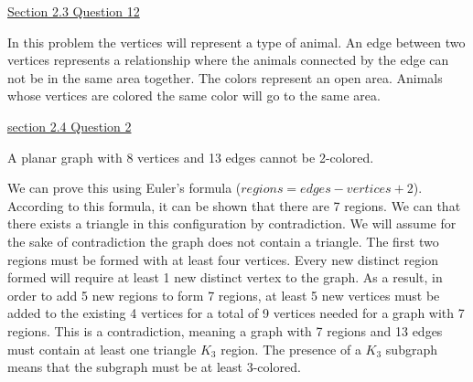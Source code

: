 \documentclass{article}
\begin{document}
\underline{Section 2.3 Question 12}

In this problem the vertices will represent a type of animal. An edge between two vertices represents a relationship where the animals connected by the edge can not be in the same area together. The colors represent an open area. Animals whose vertices are colored the same color will go to the same area.

\underline{section 2.4 Question 2}

A planar graph with 8 vertices and 13 edges cannot be 2-colored.

We can prove this using Euler's formula ($regions=edges-vertices+2$). According to this formula, it can be shown that there are 7 regions. We can that there exists a triangle in this configuration by contradiction. We will assume for the sake of contradiction the graph does not contain a triangle. The first two regions must be formed with at least four vertices. Every new distinct region formed will require at least 1 new distinct vertex to the graph. As a result, in order to add 5 new regions to form 7 regions, at least 5 new vertices must be added to the existing 4 vertices for a total of 9 vertices needed for a graph with 7 regions. This is a contradiction, meaning a graph with 7 regions and 13 edges must contain at least one triangle $K_3$ region. The presence of a $K_3$ subgraph means that the subgraph must be at least 3-colored. 
\end{document}
